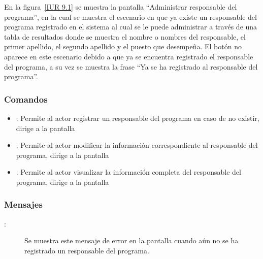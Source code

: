 
    En la figura~\ref{IUR 9.1} se muestra la pantalla ``Administrar responsable del programa'', en la cual se muestra el escenario en que ya existe un responsable del programa registrado en el sistema al cual se le puede administrar %
    a través de una tabla de resultados donde se muestra el nombre o nombres del responsable, el primer apellido, el segundo apellido y el puesto que desempeña. El botón  no aparece en este escenario debido a que ya se encuentra registrado el responsable del programa, a su vez se muestra la frase ``Ya se ha registrado al responsable del programa''.%


\subsubsection{Comandos}
\begin{itemize}
	\item {}: Permite al actor registrar un responsable del programa en caso de no existir, dirige a la pantalla  
	\item {}: Permite al actor modificar la información correspondiente al responsable del programa, dirige a la pantalla  
	\item {}: Permite al actor visualizar la información completa del responsable del programa, dirige a la pantalla 
\end{itemize}

\subsubsection{Mensajes}

	
\begin{description}
	\item[:] Se muestra este mensaje de error en la pantalla  cuando aún no se ha registrado un responsable del programa.
\end{description}
